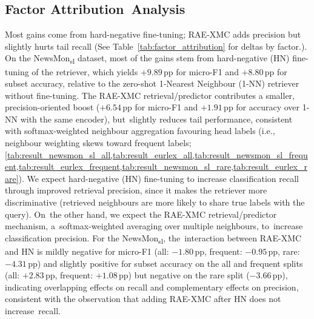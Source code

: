 \documentclass[make,article,accept,pdftex,moreauthors]{Definitions/mdpi}
\begin{document}
\subsection{Factor Attribution~Analysis}
\label{sec:factor_attribution_analysis} 



Most gains come from hard-negative fine-tuning; RAE-XMC adds precision but slightly hurts tail recall (See Table~\ref{tab:factor_attribution} for deltas by factor.).
On the NewsMon\textsubscript{sl} dataset, most of the gains stem from hard-negative (HN) fine-tuning of the retriever, which yields $+9.89$\,pp for micro-F1 and $+8.80$\,pp for subset accuracy, relative to the zero-shot 1‑Nearest Neighbour (1-NN) retriever without fine-tuning.
The RAE-XMC retrieval/predictor contributes a smaller, precision-oriented boost ($+6.54$\,pp for micro-F1 and $+1.91$\,pp for accuracy over 1-NN with the same encoder), but~slightly reduces tail performance, consistent with softmax-weighted neighbour aggregation favouring head labels (i.e., neighbour weighting skews toward frequent labels; \cref{tab:result_newsmon_sl_all,tab:result_eurlex_all,tab:result_newsmon_sl_frequent,tab:result_eurlex_frequent,tab:result_newsmon_sl_rare,tab:result_eurlex_rare}). 
We expect hard-negative (HN) fine-tuning to increase classification recall through improved retrieval precision, since it makes the retriever more discriminative (retrieved neighbours are more likely to share true labels with the query). On~the other hand, we expect the RAE-XMC retrieval/predictor mechanism, a~softmax-weighted averaging over multiple neighbours, to~increase classification precision.
For the NewsMon\textsubscript{sl}, the~interaction between RAE-XMC and HN is mildly negative for micro-F1 (all: $-1.80$\,pp, frequent: $-0.95$\,pp, rare: $-4.31$\,pp) and slightly positive for subset accuracy on the all and frequent splits (all: $+2.83$\,pp, frequent: $+1.08$\,pp) but negative on the rare split ($-3.66$\,pp), indicating overlapping effects on recall and complementary effects on precision, consistent with the observation that adding RAE-XMC after HN does not increase~recall.
\end{document}
